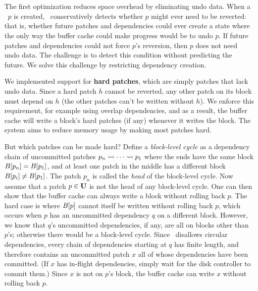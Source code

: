 
\subsection{\Nrb\ \Patches}
\label{sec:patch:nrb}

The first optimization reduces space overhead by
eliminating undo data.
%
When a \patch\ $p$ is created, \Kudos\ conservatively detects whether $p$
 might ever need to be reverted:
%
that is, whether future patches and dependencies could ever create a state
 where the only way the buffer cache could make progress would be to undo
 $p$.
%
If future patches and dependencies could not force
 $p$'s reversion, then $p$ does not need undo data.
%
The challenge is to detect this condition without predicting the future.
%
We solve this challenge by restricting dependency creation.


We implemented support for \textbf{hard patches}, which are simply patches
 that lack undo data.
%
Since a hard patch $h$ cannot be reverted, any other patch on its block
 must depend on $h$ (the other patches can't be written without $h$).
%
We enforce this requirement, for example using overlap
 dependencies, and
%
as a result, the buffer cache will write a block's hard patches (if any)
 whenever it writes the block.
%
The system aims to reduce memory usage by making most patches hard.


But which patches can be made hard?
%
Define a \emph{block-level cycle} as a dependency chain of uncommitted
 patches $p_n \leadsto \cdots \leadsto p_1$ where the ends have the same
 block $B[{p_n}] = B[{p_1}]$, and at least one patch in the middle
 has a different block $B[{p_i}] \neq B[{p_1}]$.
%
The patch $p_n$ is called the \emph{head} of the block-level cycle.
%
Now assume that a patch $p \in \PMem$ is not the head of any block-level
 cycle.
%
One can then show that the buffer cache can always write a block without
 rolling back $p$.
%
The hard case is where $B[{p}]$ cannot itself be written without
 rolling back $p$, which occurs when $p$ has an uncommitted dependency $q$
 on a different block.
%
However, we know that $q$'s uncommitted dependencies, if any, are all on
 blocks other than $p$'s; otherwise there would be a block-level cycle.
%
Since \Featherstitch\ disallows circular dependencies, every
 chain of dependencies starting at $q$ has finite length, and therefore
 contains an uncommitted patch $x$ all of whose dependencies have
 been committed.
%
(If $x$ has in-flight dependencies, simply wait
 for the disk controller to commit them.)
%
Since $x$ is not on $p$'s block, the buffer cache can write $x$ without
 rolling back $p$.


